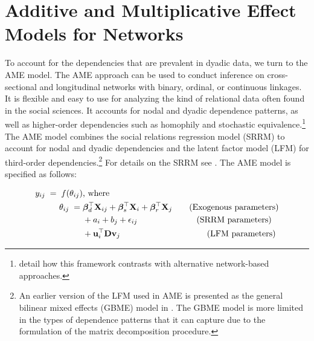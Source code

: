 

\section{\textbf{Additive and Multiplicative Effect Models for Networks}}

To account for the dependencies that are prevalent in dyadic data, we turn to the AME model. The AME approach can be used to conduct inference on cross-sectional and longitudinal networks with binary, ordinal, or continuous linkages. It is flexible and easy to use for analyzing the kind of relational data often found in the social sciences. It accounts for nodal and dyadic dependence patterns, as well as higher-order dependencies such as homophily and stochastic equivalence.\footnote{\citet{minhas:etal:2019} detail how this framework contrasts with alternative network-based approaches. } The AME model combines the social relations regression model (SRRM) to account for nodal and dyadic dependencies and the latent factor model (LFM) for third-order dependencies.\footnote{An earlier version of the LFM  used in AME is presented as the general bilinear mixed effects (GBME) model in \citet{hoff:2005}. The GBME model is more limited in the types of dependence patterns that it can capture due to the formulation of the matrix decomposition procedure.}  For details on the SRRM see \citet{li:loken:2002,hoff:2005,dorff:minhas:2017}. The AME model is specified as follows:

\begin{align}
	\begin{aligned}
		y_{ij} \;=\; f(\theta_{ij}) &\text{, where } \\
		\theta_{ij} \;=\;& \bm\beta_{d}^{\top} \mathbf{X}_{ij} + \bm\beta_{s}^{\top} \mathbf{X}_{i} + \bm\beta_{r}^{\top} \mathbf{X}_{j} \text{\qquad(Exogenous parameters)} \\
		& + a_{i} + b_{j} + \epsilon_{ij} \text{\qquad\qquad\qquad\quad(SRRM parameters)} \\
		& + \mathbf{u}_{i}^{\top} \mathbf{D} \mathbf{v}_{j}  \text{\qquad\qquad\qquad\qquad\qquad\;(LFM parameters)} \\
	\label{eqn:ame}
	\end{aligned}
\end{align}

